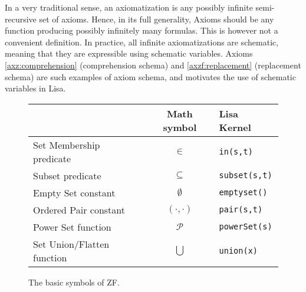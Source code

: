 In a very traditional sense, an axiomatization is any possibly infinite semi-recursive set of axioms. Hence, in its full generality, Axioms should be any function producing possibly infinitely many formulas.
This is however not a convenient definition. In practice, all infinite axiomatizations are schematic, meaning that they are expressible using schematic variables. Axioms \ref{axz:comprehension} (comprehension schema) and \ref{axzf:replacement} (replacement schema) are such examples of axiom schema, and motivates the use of schematic variables in Lisa.

\begin{figure}
  \begin{center}
    \begin{tabular}{l|c|l}
      {}                         & Math symbol       & Lisa Kernel             \\ \hline
      Set Membership predicate   & $\in$             & \lstinline$in(s,t)$     \\
      Subset predicate           & $\subseteq$       & \lstinline$subset(s,t)$ \\
      Empty Set constant         & $\emptyset$       & \lstinline$emptyset()$  \\
      Ordered Pair constant      & $(\cdot, \cdot )$ & \lstinline$pair(s,t)$   \\
      Power Set function         & $\mathcal P$      & \lstinline$powerSet(s)$ \\
      Set Union/Flatten function & $\bigcup$         & \lstinline$union(x)$    \\
    \end{tabular}

    \caption{The basic symbols of ZF.}
    \label{fig:symbolszf}
  \end{center}
\end{figure}

